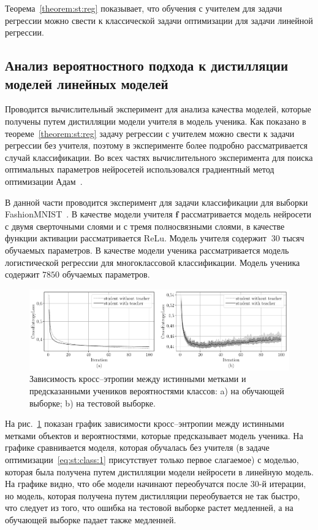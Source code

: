 Теорема~\ref{theorem:st:reg} показывает, что обучения с учителем для задачи регрессии можно свести к классической задачи оптимизации для задачи линейной регрессии.

\subsection{Анализ вероятностного подхода к дистилляции моделей линейных моделей}
Проводится вычислительный эксперимент для анализа качества моделей, которые получены путем дистилляции модели учителя в модель ученика. Как показано в теореме~\ref{theorem:st:reg} задачу регрессии с учителем можно свести к задачи регрессии без учителя, поэтому в эксперименте более подробно рассматривается случай классификации. Во всех частях вычислительного эксперимента для поиска оптимальных параметров нейросетей использовался градиентный метод оптимизации Адам~\cite{kingma2014}.

В данной части проводится эксперимент для задачи классификации для выборки FashionMNIST~\cite{fashionmnist}. В качестве модели учителя $\mathbf{f}$ рассматривается модель нейросети с двумя сверточными слоями и с тремя полносвязными слоями, в качестве функции активации рассматривается ReLu. Модель учителя содержит $~30$ тысяч обучаемых параметров. В качестве модели ученика рассматривается модель логистической регрессии для многоклассовой классификации. Модель ученика содержит $7850$ обучаемых параметров.

\begin{figure}[h!t]\center
\includegraphics[width=1\textwidth]{results/privlearn/mnist_loss}
\caption{Зависимость кросс--этропии между истинными метками и предсказанными учеников вероятностями классов: a) на обучающей выборке; b) на тестовой выборке.}
\label{fg:ex:fashionmnist:loss}
\end{figure}

На рис.~\ref{fg:ex:fashionmnist:loss} показан график зависимости кросс--энтропии между истинными метками объектов и вероятностями, которые предсказывает модель ученика. На графике сравнивается моделя, которая обучалась без учителя (в задаче оптимизации~\eqref{eq:st:class:1} присутствует только первое слагаемое) с моделью, которая была получена путем дистилляции модели нейросети в линейную модель. На графике видно, что обе модели начинают переобучатся после 30-й итерации, но модель, которая получена путем дистилляции переобувается не так быстро, что следует из того, что ошибка на тестовой выборке растет медленней, а на обучающей выборке падает также медленней.


